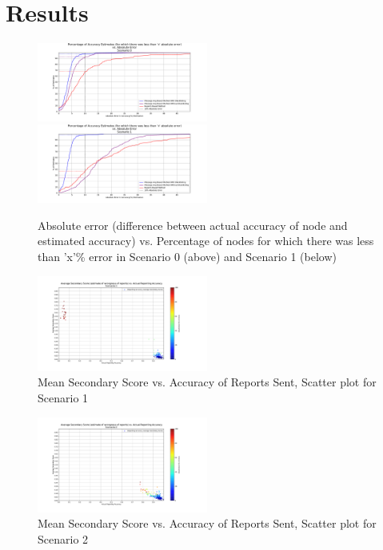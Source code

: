 \documentclass[journal]{IEEEtran}
\begin{document}
\section{Results}
\label{sec:Results}
\begin{figure}[!t]
	\caption{Absolute error (difference between actual accuracy of node and estimated accuracy) vs. Percentage of nodes for which there was less than 'x'\% error in Scenario 0 (above) and Scenario 1 (below)}
	\label{fig:plot:comparitiveSCN0&1}
	\includegraphics[width=0.5\textwidth, trim={80 20 80 30},clip]{images/SCN0_AbsoluteErrorsInEstimationComparison.pdf}
	\includegraphics[width=0.5\textwidth, trim={80 20 80 30},clip]{images/SCN1_AbsoluteErrorsInEstimationComparison.pdf}
\end{figure}
\begin{figure}[!t]
	\caption{Mean Secondary Score vs. Accuracy of Reports Sent, Scatter plot for Scenario 1}
	\label{fig:plot:ssSCN1}
	\includegraphics[width=0.5\textwidth, trim={100 50 185 72},clip]{images/SCN1_ReportingAccuracy_Vs_AvgSecondaryScore.pdf}
\end{figure}
\begin{figure}[!t]
	\caption{Mean Secondary Score vs. Accuracy of Reports Sent, Scatter plot for Scenario 2}
	\label{fig:plot:ssSCN2}
	\includegraphics[width=0.5\textwidth, trim={100 50 185 72},clip]{images/SCN2_ReportingAccuracy_Vs_AvgSecondaryScore.pdf}
\end{figure}
\end{document}
